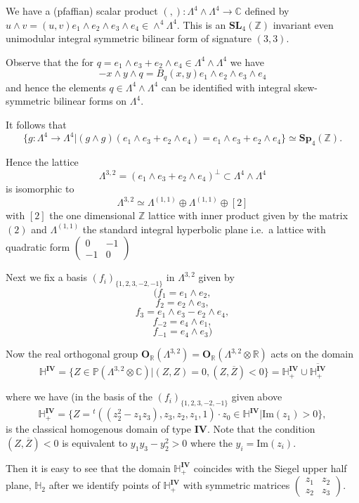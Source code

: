\documentclass[9pt]{amsart} \usepackage[utf8]{inputenc}
\newcommand{\Imag}{\mathrm{Im}}
\newcommand{\Proj}{\mathbb{P}}
\newcommand{\Z}{\mathbb{Z}} \newcommand{\C}{\mathbb{C}}
\newcommand{\R}{\mathbb{R}} \newcommand{\La}{\Lambda}
\newcommand{\HypPlan}{\Lambda^{(1,1)}}
\newcommand{\Sp}{\mathbf{Sp}}
\newcommand{\SL}{\mathbf{SL}}
\newcommand{\Orth}{\mathbf{O}}
\newcommand{\Hpl}{\mathbb{H}}
\newcommand{\IV}{\mathbf{IV}}
\newcommand{\fbasis}{(f_i)_{\{1,2,3,-2,-1\}}}
\begin{document}
We have a (pfaffian) scalar product
$(,): \La^4 \wedge \La^4 \rightarrow \C$ defined by $u \wedge v =
(u,v)e_1 \wedge e_2 \wedge e_3 \wedge e_4 \in \wedge^4 \La^4$.  This is
an $\SL_4(\Z)$ invariant even unimodular integral symmetric bilinear
form of signature $(3,3)$.

Observe that the for $q = e_1\wedge e_3 + e_2 \wedge e_4 \in \La^4
\wedge \La^4$ we have $$-x \wedge y \wedge q = B_q(x,y) e_1 \wedge e_2
\wedge e_3 \wedge e_4$$ and hence the elements $q \in \La^4 \wedge
\La^4$ can be identified with integral skew-symmetric bilinear forms on
$\La^4$.


It follows that $$ \{ g : \La^4 \rightarrow \La^4 | (g \wedge g)(e_1
\wedge e_3 + e_2 \wedge e_4) = e_1 \wedge e_3 + e_2 \wedge e_4 \} \simeq
\Sp_4(\Z).$$

Hence the lattice $$\La^{3,2} = (e_1 \wedge e_3 + e_2 \wedge e_4)^{\perp}
\subset \La^4 \wedge \La^4$$ is isomorphic to $$\La^{3,2} \simeq \HypPlan \oplus \HypPlan \oplus [2]$$
with $[2]$ the one dimensional $\Z$ lattice with inner product given by
the matrix $(2)$ and $\HypPlan$ the standard integral hyperbolic plane i.e.\ a lattice with
quadratic form $\begin{pmatrix}0 & -1\\ -1 & 0\end{pmatrix}$

Next we fix a basis $\fbasis$ in $\La^{3,2}$ given by
$$ (f_1 = e_1 \wedge e_2,$$
$$ f_2 = e_2 \wedge e_3,$$
$$ f_3 = e_1 \wedge e_3 - e_2 \wedge e_4, $$
$$ f_{-2} = e_4 \wedge e_1, $$
$$ f_{-1} = e_4 \wedge e_3)$$

Now the real orthogonal group $\Orth_{\R}(\La^{3,2}) =
\Orth_{\R}(\La^{3,2}\otimes \R)$ acts on the domain $$\Hpl^{\IV} = \{ Z \in
\Proj(\La^{3,2} \otimes \C) | (Z,Z) = 0, (Z, \overline{Z}) < 0\} = \Hpl_+^{\IV}
\cup \overline{\Hpl^{\IV}_+}$$

where we have (in the basis of the $\fbasis$ given above
$$\Hpl_+^{\IV} = \{ Z = {}^t((z_2^2 - z_1 z_3), z_3, z_2, z_1, 1)\cdot z_0
\in \Hpl^{\IV} |\Imag(z_1) > 0 \},$$ is the classical homogenous domain
of type $\IV$. Note that the condition $(Z,\overline{Z})<0$ is equivalent to $y_1 y_3 -
y_2^2 > 0$ where the $y_i = \Imag(z_i)$.

Then it is easy to see that the domain $\Hpl_+^{\IV}$ coincides with the
Siegel upper half plane, $\Hpl_2$ after we identify points of
$\Hpl_+^{\IV}$ with symmetric matrices $\begin{pmatrix} z_1 & z_2\\ z_2 &
z_3\end{pmatrix}$.
\end{document}
